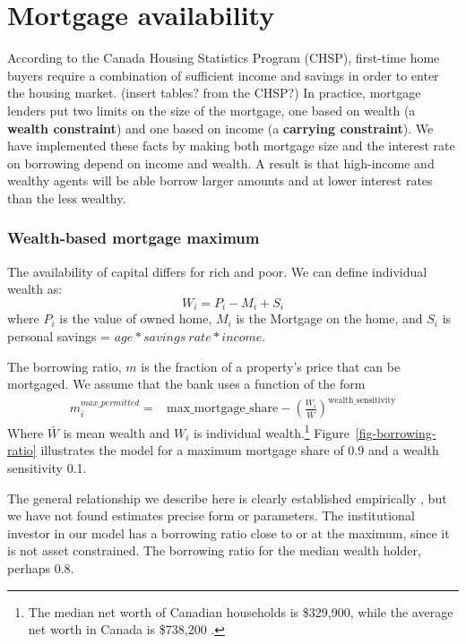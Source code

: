  {\color{black}

\section{Mortgage availability} \label{section-mortgage-availability}
According to the Canada Housing Statistics Program (CHSP), first-time home buyers require a combination of sufficient income and savings in order to enter the housing market. (insert tables? from the CHSP?) In practice, mortgage lenders put two  limits on the size of the mortgage, one based on wealth (a \textbf{wealth constraint}) and one based on income (a \textbf{carrying constraint}). We have implemented these facts by making both mortgage size and the interest rate on borrowing  depend on income and wealth. A result is that high-income and  wealthy agents will be able borrow larger amounts and at lower interest rates than the less wealthy.



\subsubsection{Wealth-based mortgage maximum} 
The availability of capital differs for rich and poor. 
We can define individual wealth as:
\[ W_i= P_i -M_i  +S_i \]
where $P_i$ is the value of owned home, $M_i$ is the  Mortgage on the home, and $S_i$ is personal savings = $age*savings\ rate* income$.

The borrowing ratio, $m$ is the fraction of a property's price that can be mortgaged. We assume that the bank uses a function of the form 
\begin{align}
m_i^{max\_permitted} =& \mathrm{max\_mortgage\_share} - \left(\frac{W_i}{\bar W}\right)^{\mathrm{wealth\_sensitivity}} \label{eqn-wealth-based-mortgage}  
\end{align} 
Where $\bar{W}$ is mean wealth and $W_i$ is individual wealth.\footnote{ The median net worth of Canadian households is \$329,900, while the average net worth in Canada is \$738,200 \cite{WEB-model-stats-can-median-net-worth}.} Figure~\ref{fig-borrowing-ratio} illustrates the model for a maximum mortgage  share of 0.9 and a wealth sensitivity 0.1.

The general relationship we describe here is clearly established empirically \cite{}, but we have not found  estimates precise form or parameters. The institutional investor in our model has a borrowing ratio close to or at the maximum, since it is not asset constrained. The borrowing ratio for the median wealth holder, perhaps 0.8.



}

